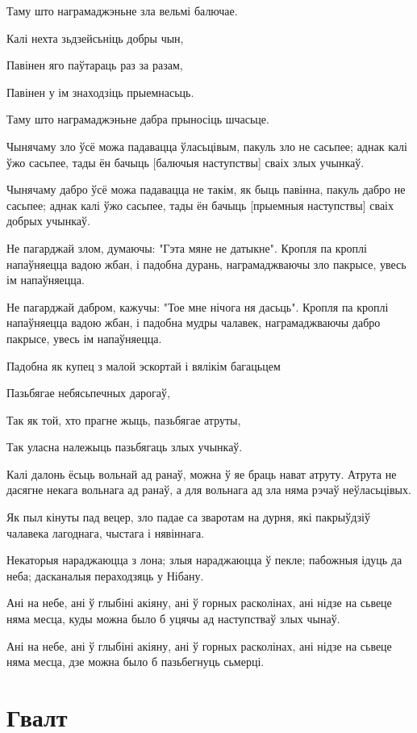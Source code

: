 \documentclass{article}
\begin{document}
Таму што награмаджэньне зла вельмі балючае.

Калі нехта зьдзейсьніць добры чын,

Павінен яго паўтараць раз за разам,

Павінен у ім знаходзіць прыемнасьць.

Таму што награмаджэньне дабра прыносіць шчасьце.

Чынячаму зло ўсё можа падавацца ўласьцівым, пакуль зло не сасьпее;
аднак калі ўжо сасьпее, тады ён бачыць {[}балючыя наступствы{]} сваіх
злых учынкаў.

Чынячаму дабро ўсё можа падавацца не такім, як быць павінна, пакуль
дабро не сасьпее; аднак калі ўжо сасьпее, тады ён бачыць {[}прыемныя
наступствы{]} сваіх добрых учынкаў.

Не пагарджай злом, думаючы: "Гэта мяне не датыкне". Кропля па
кроплі напаўняецца вадою жбан, і падобна дурань, награмаджваючы зло
пакрысе, увесь ім напаўняецца.

Не пагарджай дабром, кажучы: "Тое мне нічога ня дасьць". Кропля па
кроплі напаўняецца вадою жбан, і падобна мудры чалавек, награмаджваючы
дабро пакрысе, увесь ім напаўняецца.

Падобна як купец з малой эскортай і вялікім багацьцем

Пазьбягае небясьпечных дарогаў,

Так як той, хто прагне жыць, пазьбягае атруты,

Так уласна належыць пазьбягаць злых учынкаў.

Калі далонь ёсьць вольнай ад ранаў, можна ў яе браць нават атруту.
Атрута не дасягне некага вольнага ад ранаў, а для вольнага ад зла няма
рэчаў неўласьцівых.

Як пыл кінуты пад вецер, зло падае са зваротам на дурня, які
пакрыўдзіў чалавека лагоднага, чыстага і нявіннага.

Некаторыя нараджаюцца з лона; злыя нараджаюцца ў пекле; пабожныя
ідуць да неба; дасканалыя пераходзяць у Нібану.

Ані на небе, ані ў глыбіні акіяну, ані ў горных расколінах, ані
нідзе на сьвеце няма месца, куды можна было б уцячы ад наступстваў злых
чынаў.

Ані на небе, ані ў глыбіні акіяну, ані ў горных расколінах, ані
нідзе на сьвеце няма месца, дзе можна было б пазьбегнуць сьмерці.

\section{Гвалт}
\end{document}
